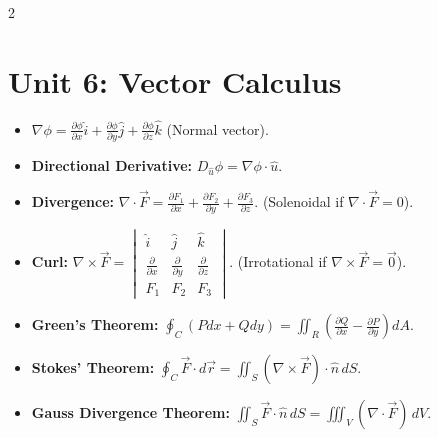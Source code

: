 \begin{multicols}{2}
{\section*{Unit 6: Vector Calculus}
\begin{itemize}[leftmargin=*]
    \item $\nabla \phi = \frac{\partial \phi}{\partial x}\hat{i} + \frac{\partial \phi}{\partial y}\hat{j} + \frac{\partial \phi}{\partial z}\hat{k}$ (Normal vector).
    \item \textbf{Directional Derivative:} $D_{\hat{u}}\phi = \nabla\phi \cdot \hat{u}$.
    \item \textbf{Divergence:} $\nabla \cdot \vec{F} = \frac{\partial F_1}{\partial x} + \frac{\partial F_2}{\partial y} + \frac{\partial F_3}{\partial z}$.
    (Solenoidal if $\nabla \cdot \vec{F} = 0$).
    \item \textbf{Curl:} $\nabla \times \vec{F} = \begin{vmatrix} \hat{i} & \hat{j} & \hat{k} \\ \frac{\partial}{\partial x} & \frac{\partial}{\partial y} & \frac{\partial}{\partial z} \\ F_1 & F_2 & F_3 \end{vmatrix}$.
    (Irrotational if $\nabla \times \vec{F} = \vec{0}$).
    \item \textbf{Green's Theorem:} $\oint_C (P dx + Q dy) = \iint_R \left(\frac{\partial Q}{\partial x} - \frac{\partial P}{\partial y}\right) dA$.
    \item \textbf{Stokes' Theorem:} $\oint_C \vec{F} \cdot d\vec{r} = \iint_S (\nabla \times \vec{F}) \cdot \hat{n} \, dS$.
    \item \textbf{Gauss Divergence Theorem:} $\iint_S \vec{F} \cdot \hat{n} \, dS = \iiint_V (\nabla \cdot \vec{F}) \, dV$.
\end{itemize}
}
\end{multicols}
\newpage
